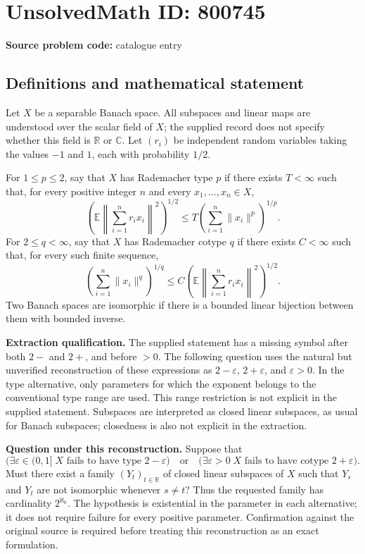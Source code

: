\documentclass[11pt]{article}
\newcommand{\R}{\mathbb{R}}
\newcommand{\C}{\mathbb{C}}
\newcommand{\E}{\mathbb{E}}
\begin{document}
\section*{UnsolvedMath ID: 800745}
\textbf{Source problem code:} catalogue entry
\subsection{Definitions and mathematical statement}
Let \(X\) be a separable Banach space. All subspaces and linear maps are understood over the scalar field of \(X\); the supplied record does not specify whether this field is \(\R\) or \(\C\). Let \((r_i)\) be independent random variables taking the values \(-1\) and \(1\), each with probability \(1/2\).

For \(1\le p\le2\), say that \(X\) has Rademacher type \(p\) if there exists \(T<\infty\) such that, for every positive integer \(n\) and every \(x_1,\ldots,x_n\in X\),
\[
\left(\E\left\|\sum_{i=1}^n r_i x_i\right\|^2\right)^{1/2}
\le T\left(\sum_{i=1}^n\|x_i\|^p\right)^{1/p}.
\]
For \(2\le q<\infty\), say that \(X\) has Rademacher cotype \(q\) if there exists \(C<\infty\) such that, for every such finite sequence,
\[
\left(\sum_{i=1}^n\|x_i\|^q\right)^{1/q}
\le C\left(\E\left\|\sum_{i=1}^n r_i x_i\right\|^2\right)^{1/2}.
\]
Two Banach spaces are isomorphic if there is a bounded linear bijection between them with bounded inverse.

\textbf{Extraction qualification.} The supplied statement has a missing symbol after both \(2-\) and \(2+\), and before \(>0\). The following question uses the natural but unverified reconstruction of these expressions as \(2-\varepsilon\), \(2+\varepsilon\), and \(\varepsilon>0\). In the type alternative, only parameters for which the exponent belongs to the conventional type range are used. This range restriction is not explicit in the supplied statement. Subspaces are interpreted as closed linear subspaces, as usual for Banach subspaces; closedness is also not explicit in the extraction.

\textbf{Question under this reconstruction.} Suppose that
\[
\bigl(\exists\varepsilon\in(0,1]\; X\text{ fails to have type }2-\varepsilon\bigr)
\quad\text{or}\quad
\bigl(\exists\varepsilon>0\; X\text{ fails to have cotype }2+\varepsilon\bigr).
\]
Must there exist a family \((Y_t)_{t\in\R}\) of closed linear subspaces of \(X\) such that \(Y_s\) and \(Y_t\) are not isomorphic whenever \(s\ne t\)? Thus the requested family has cardinality \(2^{\aleph_0}\). The hypothesis is existential in the parameter in each alternative; it does not require failure for every positive parameter. Confirmation against the original source is required before treating this reconstruction as an exact formulation.
\end{document}
